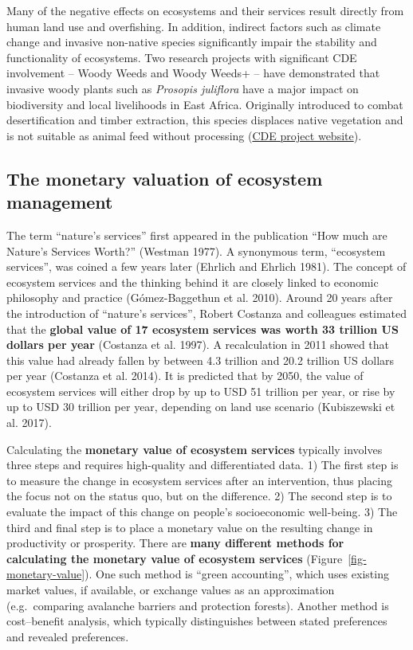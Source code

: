 \documentclass[
  a4paper,
  DIV=11,
  numbers=noendperiod,
  oneside,
  openany]{scrreprt}
\begin{document}
Many of the negative effects on ecosystems and their services result
directly from human land use and overfishing. In addition, indirect
factors such as climate change and invasive non-native species
significantly impair the stability and functionality of ecosystems. Two
research projects with significant CDE involvement -- Woody Weeds and
Woody Weeds+ -- have demonstrated that invasive woody plants such as
\emph{Prosopis juliflora} have a major impact on biodiversity and local
livelihoods in East Africa. Originally introduced to combat
desertification and timber extraction, this species displaces native
vegetation and is not suitable as animal feed without processing
(\href{https://www.cde.unibe.ch/research/projects/woody_invasive_alien_species_in_eastern_africa/index_eng.html}{CDE
project website}).

\subsection{The monetary valuation of ecosystem
management}\label{the-monetary-valuation-of-ecosystem-management}

The term ``nature's services'' first appeared in the publication ``How
much are Nature's Services Worth?'' (Westman 1977). A synonymous term,
``ecosystem services'', was coined a few years later (Ehrlich and
Ehrlich 1981). The concept of ecosystem services and the thinking behind
it are closely linked to economic philosophy and practice
({Gómez-Baggethun et al.} 2010). Around 20 years after the introduction
of ``nature's services'', Robert Costanza and colleagues estimated that
the \textbf{global value of 17 ecosystem services was worth 33 trillion
US dollars per year} (Costanza et al. 1997). A recalculation in 2011
showed that this value had already fallen by between 4.3 trillion and
20.2 trillion US dollars per year (Costanza et al. 2014). It is
predicted that by 2050, the value of ecosystem services will either drop
by up to USD 51 trillion per year, or rise by up to USD 30 trillion per
year, depending on land use scenario (Kubiszewski et al. 2017).

Calculating the \textbf{monetary value of ecosystem services} typically
involves three steps and requires high-quality and differentiated data.
1) The first step is to measure the change in ecosystem services after
an intervention, thus placing the focus not on the status quo, but on
the difference. 2) The second step is to evaluate the impact of this
change on people's socioeconomic well-being. 3) The third and final step
is to place a monetary value on the resulting change in productivity or
prosperity. There are \textbf{many different methods for calculating the
monetary value of ecosystem services} (Figure~\ref{fig-monetary-value}).
One such method is ``green accounting'', which uses existing market
values, if available, or exchange values as an approximation
(e.g.~comparing avalanche barriers and protection forests). Another
method is cost--benefit analysis, which typically distinguishes between
stated preferences and revealed preferences.
\end{document}
